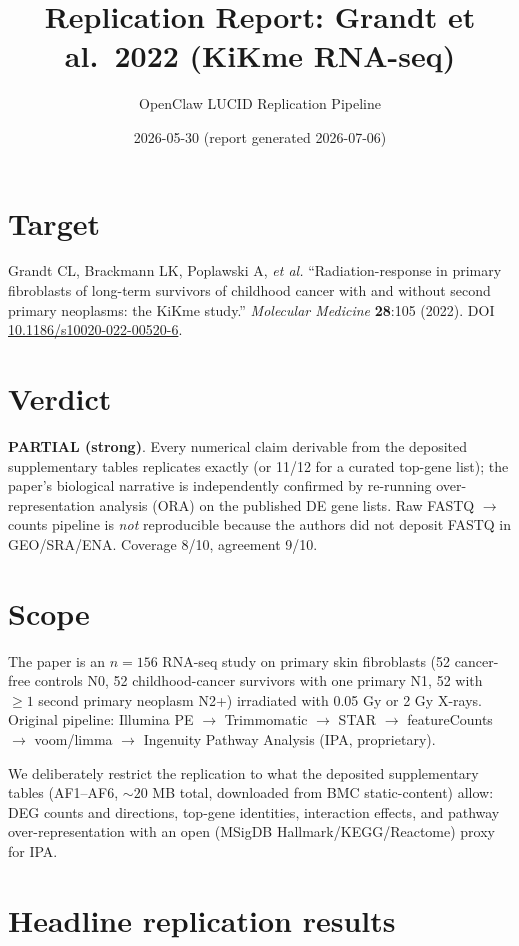 \documentclass[11pt]{article}
\title{Replication Report: Grandt et al.\ 2022 (KiKme RNA-seq)}
\author{OpenClaw LUCID Replication Pipeline}
\date{2026-05-30 (report generated 2026-07-06)}
\begin{document}
\maketitle

\section*{Target}
Grandt CL, Brackmann LK, Poplawski A, \emph{et al.}
``Radiation-response in primary fibroblasts of long-term survivors of childhood cancer with and without second primary neoplasms: the KiKme study.''
\emph{Molecular Medicine} \textbf{28}:105 (2022).
DOI \href{https://doi.org/10.1186/s10020-022-00520-6}{10.1186/s10020-022-00520-6}.

\section*{Verdict}
\textbf{PARTIAL (strong)}. Every numerical claim derivable from the deposited supplementary tables replicates exactly (or 11/12 for a curated top-gene list); the paper's biological narrative is independently confirmed by re-running over-representation analysis (ORA) on the published DE gene lists. Raw FASTQ $\rightarrow$ counts pipeline is \emph{not} reproducible because the authors did not deposit FASTQ in GEO/SRA/ENA. Coverage 8/10, agreement 9/10.

\section{Scope}
The paper is an $n=156$ RNA-seq study on primary skin fibroblasts (52 cancer-free controls N0, 52 childhood-cancer survivors with one primary N1, 52 with $\geq 1$ second primary neoplasm N2+) irradiated with 0.05 Gy or 2 Gy X-rays. Original pipeline: Illumina PE $\to$ Trimmomatic $\to$ STAR $\to$ featureCounts $\to$ voom/limma $\to$ Ingenuity Pathway Analysis (IPA, proprietary).

We deliberately restrict the replication to what the deposited supplementary tables (AF1--AF6, $\sim 20$ MB total, downloaded from BMC static-content) allow:
DEG counts and directions, top-gene identities, interaction effects, and pathway over-representation with an open (MSigDB Hallmark/KEGG/Reactome) proxy for IPA.

\section{Headline replication results}
\end{document}

